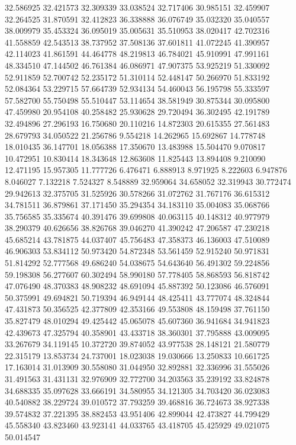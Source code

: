 32.586925
32.421573
32.309339
33.038524
32.717406
30.985151
32.459907
32.264525
31.870591
32.412823
36.338888
36.076749
35.032320
35.040557
38.009979
35.453324
36.095019
35.005631
35.510953
38.020417
42.702316
41.558859
42.543513
38.737952
37.508136
37.601811
41.072245
41.390957
42.114023
41.861591
44.464778
48.219813
46.784021
45.910991
47.991161
48.334510
47.144502
46.761384
46.086971
47.907375
53.925219
51.330092
52.911859
52.700742
52.235172
51.310114
52.448147
50.266970
51.833192
52.084364
53.229715
57.664739
52.934134
54.460043
56.195798
55.333597
57.582700
55.750498
55.510447
53.114654
38.581949
30.875344
30.095800
47.459980
20.954108
40.258482
25.930628
29.720494
36.302495
42.191789
32.494896
27.296193
16.750680
20.110216
14.872303
20.615355
27.561483
28.679793
34.050522
21.256786
9.554218
14.262965
15.692867
14.778748
18.010435
36.147701
18.056388
17.350670
13.483988
15.504470
9.070817
10.472951
10.830414
18.343648
12.863608
11.825443
13.894408
9.210090
12.471195
15.957305
11.777726
6.476471
6.888913
8.971925
8.222603
6.947876
8.046027
7.132218
7.524327
8.548889
32.959064
34.658052
32.319943
30.772474
29.942613
32.375705
31.525926
30.578266
31.072762
31.767176
36.615312
34.781511
36.879861
37.171450
35.294354
34.183110
35.004083
35.068766
35.756585
35.335674
40.391476
39.699808
40.063115
40.148312
40.977979
38.290379
40.626656
38.826768
39.046270
41.390242
47.206587
47.230218
45.685214
43.781875
44.037407
45.756483
47.358373
46.136003
47.510089
46.906303
53.834112
50.973420
54.872348
53.561459
52.915240
50.971831
51.814292
52.777568
49.686240
54.038675
54.643640
56.491302
59.224856
59.198308
56.277607
60.302494
58.990180
57.778405
58.868593
56.818742
47.076490
48.370383
48.908232
48.691094
45.887392
50.123086
46.576091
50.375991
49.694821
50.719394
46.949144
48.425411
43.777074
48.324844
47.431873
50.356525
42.377809
42.353166
49.553808
48.159498
37.761150
35.827479
48.010294
49.425442
45.065078
45.607360
36.941684
34.941823
42.439673
47.325794
40.358901
43.433718
38.360301
37.795888
43.009095
33.267679
34.119145
10.372720
39.874052
43.977538
28.148121
21.580779
22.315179
13.853734
24.737001
18.023038
19.030666
13.250833
10.661725
17.163014
31.013909
30.558080
31.044950
32.892881
32.336996
31.555026
31.491563
31.431131
32.976909
32.772700
34.203563
35.239192
33.824878
34.688335
35.097628
33.666191
34.580955
34.121305
34.703420
36.023083
40.540882
38.229724
39.010572
37.793259
39.468816
36.724673
38.927338
39.574832
37.221395
38.882453
43.951406
42.899044
42.473827
44.799429
45.558340
43.823460
43.923141
44.033765
43.418705
45.425929
49.021075
50.014547
